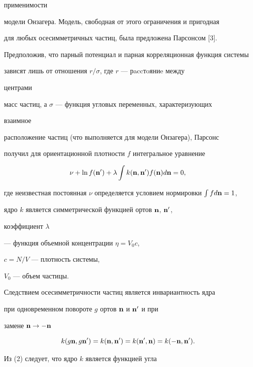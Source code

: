применимости 


модели Онзагера. Модель, свободная от этого ограничения и пригодная 


для любых осесимметричных частиц, была предложена Парсонсом [3]. 


Предположив, что парный потенциал и парная корреляционная функция системы 


зависят лишь от отношения $r/\sigma$, где $r$ --- рaccтoяниe между 


центрами 


масс частиц, а $\sigma$ --- функция угловых переменных, характеризующих 


взаимное


расположение частиц (что выполняется для модели Онзагера), Парсонс 


получил для ориентационной плотности $f$ интегральное уравнение


\begin{equation}


\nu+\ln f(\bold n')+\lambda\int k(\bold n,\bold n')


f(\bold n)d\bold n=0,


\end{equation}


где неизвестная постоянная $\nu$ определяется условием нормировки $\int 


f d\bold n=1$,


ядро $k$ является симметрической функцией ортов $\bold n$, $\bold n'$, 


коэффициент $\lambda$


--- функция объемной концентрации $\eta=V_0c$,


$c=N/V$ --- плотность системы,


$V_0$ --- объем частицы. 


Следствием осесимметричности частиц является инвариантность ядра 


при одновременном повороте $g$ ортов $\bold n$ и $\bold n'$ и при 


замене $\bold n\to-\bold n$


\begin{equation}


k(g\bold n,g\bold n')=k(\bold n,\bold n')=


k(\bold n',\bold n)=k(-\bold n,\bold n').


\end{equation}


Из (2) следует, что ядро $k$ является функцией угла


